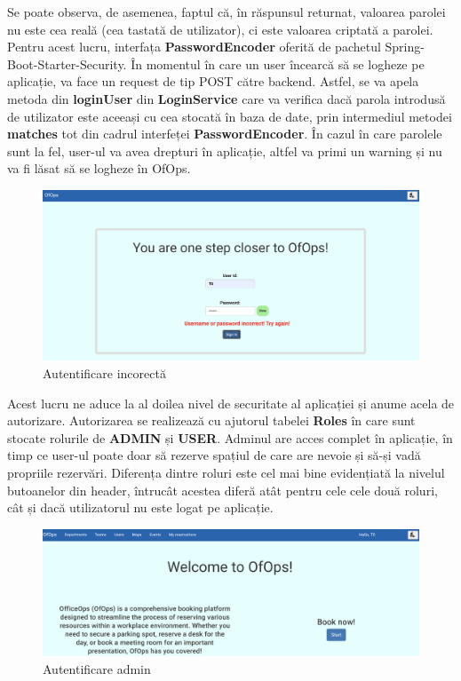 Se poate observa, de asemenea, faptul că, în răspunsul returnat, valoarea parolei nu este cea reală (cea tastată de utilizator), ci este valoarea criptată a parolei. Pentru acest lucru, interfața \textbf{PasswordEncoder} oferită de pachetul Spring-Boot-Starter-Security. În momentul în care un user încearcă să se logheze pe aplicație, va face un request de tip POST către backend. Astfel, se va apela metoda din \textbf{loginUser} din \textbf{LoginService} care va verifica dacă parola introdusă de utilizator este aceeași cu cea stocată în baza de date, prin intermediul metodei \textbf{matches} tot din cadrul interfeței \textbf{PasswordEncoder}. În cazul în care parolele sunt la fel, user-ul va avea drepturi în aplicație, altfel va primi un warning și nu va fi lăsat să se logheze în OfOps.

\begin{figure}[!htb]
    \centering
    \includegraphics[width=0.9\linewidth]{images/autentificare-gresita.png}
    \caption{Autentificare incorectă}
    \label{fig:autentificare-gresita}
\end{figure}

Acest lucru ne aduce la al doilea nivel de securitate al aplicației și anume acela de autorizare. Autorizarea se realizează cu ajutorul tabelei \textbf{Roles} în care sunt stocate rolurile de \textbf{ADMIN} și \textbf{USER}. Adminul are acces complet în aplicație, în timp ce user-ul poate doar să rezerve spațiul de care are nevoie și să-și vadă propriile rezervări. Diferența dintre roluri este cel mai bine evidențiată la nivelul butoanelor din header, întrucât acestea diferă atât pentru cele cele două roluri, cât și dacă utilizatorul nu este logat pe aplicație. 

\begin{figure}[!htb]
    \centering
    \includegraphics[width=0.9\linewidth]{images/pagina-admin.png}
    \caption{Autentificare admin}
    \label{fig:pagina-admin}
\end{figure}


